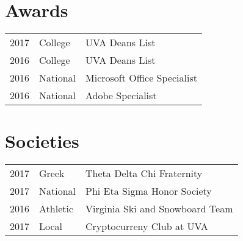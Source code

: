 \documentclass[]{deedy-resume-openfont}
\begin{document}
\begin{minipage}[t]{0.66\textwidth}

\section{Awards} 
\begin{tabular}{rll}
2017 & College & UVA Deans List \\
2016 & College & UVA Deans List \\
2016 & National & Microsoft Office Specialist \\
2016 & National & Adobe Specialist \\

\end{tabular}
\sectionsep


\section{Societies} 

\begin{tabular}{rll}
2017 	& Greek    & Theta Delta Chi Fraternity\\
2017   & National   & Phi Eta Sigma Honor Society\\
2016  & Athletic    & Virginia Ski and Snowboard Team \\
2017   & Local  &    Cryptocurreny Club at UVA
\end{tabular}
\sectionsep

\end{minipage} 
\end{document}
